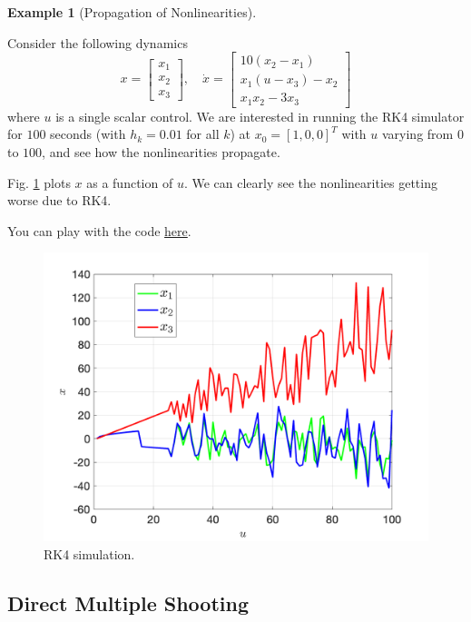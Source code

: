 \documentclass[
]{book}
\theoremstyle{definition}
\theoremstyle{definition}
\newtheorem{example}{Example}[chapter]
\theoremstyle{definition}
\theoremstyle{definition}
\theoremstyle{remark}
\begin{document}
\begin{example}[Propagation of Nonlinearities]
\protect\hypertarget{exm:RK4-simulation}{}\label{exm:RK4-simulation}

Consider the following dynamics
\[
x = \begin{bmatrix} x_1 \\ x_2 \\ x_3 \end{bmatrix}, \quad 
\dot{x} = \begin{bmatrix} 
10(x_2 - x_1) \\
x_1(u - x_3) - x_2 \\
x_1 x_2 - 3 x_3 
\end{bmatrix}
\]
where \(u\) is a single scalar control. We are interested in running the RK4 simulator for \(100\) seconds (with \(h_k = 0.01\) for all \(k\)) at \(x_0 = [1,0,0]^T\) with \(u\) varying from \(0\) to \(100\), and see how the nonlinearities propagate.

Fig. \ref{fig:RK4-simulate} plots \(x\) as a function of \(u\). We can clearly see the nonlinearities getting worse due to RK4.

You can play with the code \href{https://github.com/ComputationalRobotics/OptimalControlEstimation-Examples/blob/main/RK4_example.m}{here}.

\begin{figure}

{\centering \includegraphics[width=0.6\linewidth]{images/RK4-sim} 

}

\caption{RK4 simulation.}\label{fig:RK4-simulate}
\end{figure}

\end{example}

\hypertarget{direct-multiple-shooting}{%
\subsection{Direct Multiple Shooting}\label{direct-multiple-shooting}}
\end{document}
